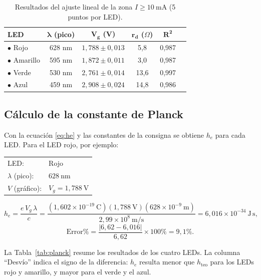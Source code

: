 \documentclass{article}
\newcommand{\Js}{\ \mathrm{J\,s}}
\begin{document}
\begin{table}[H]
\centering\small
\caption{Resultados del ajuste lineal de la zona $I\geq10\ \mathrm{mA}$ (5 puntos por LED).}
\label{tab:ajuste}
\begin{tabular}{@{}lccccc@{}}
\toprule
\textbf{LED} & $\boldsymbol{\lambda}$ \textbf{(pico)} & $\boldsymbol{V_g}$ \textbf{(V)} & $\boldsymbol{r_d}$ \textbf{($\Omega$)} & $\boldsymbol{R^2}$\\
\midrule
\textcolor{ledrojo}{$\bullet$} Rojo         & 628 nm & $1,788\pm0,013$ & 5,8  & 0,987\\
\textcolor{ledamarillo}{$\bullet$} Amarillo & 595 nm & $1,872\pm0,011$ & 3,0  & 0,987\\
\textcolor{ledverde}{$\bullet$} Verde       & 530 nm & $2,761\pm0,014$ & 13,6 & 0,997\\
\textcolor{ledazul}{$\bullet$} Azul         & 459 nm & $2,908\pm0,024$ & 14,8 & 0,986\\
\bottomrule
\end{tabular}
\end{table}

\subsection{Cálculo de la constante de Planck}

Con la ecuación \eqref{eq:he} y las constantes de la consigna se obtiene $h_e$ para cada LED. Para el LED rojo, por ejemplo:

\begin{center}
\begin{tabular}{@{}ll@{}}
LED: & Rojo\\
$\lambda$ (pico): & $628\ \mathrm{nm}$\\
$V$ (gráfico): & $V_g=1,788\ \mathrm{V}$\\
\end{tabular}
\end{center}
\begin{equation*}
    h_e=\frac{e\,V_g\,\lambda}{c}=\frac{(1,602\times10^{-19}\ \mathrm{C})(1,788\ \mathrm{V})(628\times10^{-9}\ \mathrm{m})}{2,99\times10^{8}\ \mathrm{m/s}}=6,016\times10^{-34}\Js,
\end{equation*}
\begin{equation*}
    \mathrm{Error}\%=\frac{|6,62-6,016|}{6,62}\times100\%=9,1\%.
\end{equation*}

La Tabla~\ref{tab:planck} resume los resultados de los cuatro LEDs. La columna ``Desvío'' indica el signo de la diferencia: $h_e$ resulta menor que $h_{\mathrm{teo}}$ para los LEDs rojo y amarillo, y mayor para el verde y el azul.
\end{document}
